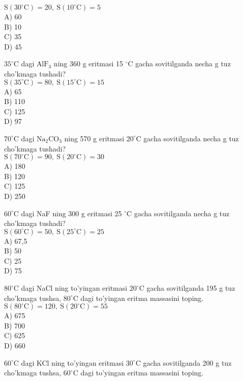 $\mathrm{S}\left(30^{\circ} \mathrm{C}\right)=20, \mathrm{~S}\left(10^{\circ} \mathrm{C}\right)=5$\\
A) 60\\
B) 10\\
C) 35\\
D) 45
  \item $35^{\circ} \mathrm{C}$ dagi $\mathrm{AlF}_{3}$ ning 360 g eritmasi 15 ${ }^{\circ} \mathrm{C}$ gacha sovitilganda necha g tuz cho'kmaga tushadi?\\
$\mathrm{S}\left(35^{\circ} \mathrm{C}\right)=80, \mathrm{~S}\left(15^{\circ} \mathrm{C}\right)=15$\\
A) 65\\
B) 110\\
C) 125\\
D) 97
  \item $70^{\circ} \mathrm{C}$ dagi $\mathrm{Na}_{2} \mathrm{CO}_{3}$ ning 570 g eritmasi $20^{\circ} \mathrm{C}$ gacha sovitilganda necha g tuz cho'kmaga tushadi?\\
$\mathrm{S}\left(70^{\circ} \mathrm{C}\right)=90, \mathrm{~S}\left(20^{\circ} \mathrm{C}\right)=30$\\
A) 180\\
B) 120\\
C) 125\\
D) 250
  \item $60^{\circ} \mathrm{C}$ dagi NaF ning 300 g eritmasi 25 ${ }^{\circ} \mathrm{C}$ gacha sovitilganda necha g tuz cho'kmaga tushadi?\\
$\mathrm{S}\left(60^{\circ} \mathrm{C}\right)=50, \mathrm{~S}\left(25^{\circ} \mathrm{C}\right)=25$\\
A) 67,5\\
B) 50\\
C) 25\\
D) 75
  \item $80^{\circ} \mathrm{C}$ dagi NaCl ning to'yingan eritmasi $20^{\circ} \mathrm{C}$ gacha sovitilganda 195 g tuz cho'kmaga tushsa, $80^{\circ} \mathrm{C}$ dagi to'yingan eritma massasini toping.\\
$\mathrm{S}\left(80^{\circ} \mathrm{C}\right)=120, \mathrm{~S}\left(20^{\circ} \mathrm{C}\right)=55$\\
A) 675\\
B) 700\\
C) 625\\
D) 660
  \item $60^{\circ} \mathrm{C}$ dagi KCl ning to'yingan eritmasi $30^{\circ} \mathrm{C}$ gacha sovitilganda 200 g tuz cho'kmaga tushsa, $60^{\circ} \mathrm{C}$ dagi to'yingan eritma massasini toping.\\

